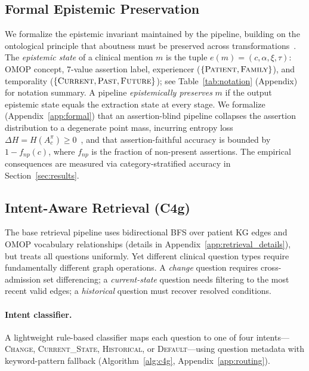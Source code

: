 \subsection{Formal Epistemic Preservation}
\label{sec:system:formal}

We formalize the epistemic invariant maintained by the \epikg pipeline, building on the ontological principle that aboutness must be preserved across transformations~\cite{ceusters2015ontologyepistemology}.
The \emph{epistemic state} of a clinical mention $m$ is the tuple $e(m) = (c, \alpha, \xi, \tau)$: OMOP concept, 7-value assertion label, experiencer ($\{\textsc{Patient}, \textsc{Family}\}$), and temporality ($\{\textsc{Current}, \textsc{Past}, \textsc{Future}\}$); see Table~\ref{tab:notation} (Appendix) for notation summary.
A pipeline \emph{epistemically preserves} $m$ if the output epistemic state equals the extraction state at every stage.
We formalize (Appendix~\ref{app:formal}) that an assertion-blind pipeline collapses the assertion distribution to a degenerate point mass, incurring entropy loss $\Delta H = H(A_c^\pi) \geq 0$~\cite{shannon1948}, and that assertion-faithful accuracy is bounded by $1 - f_{\textit{np}}(c)$, where $f_{\textit{np}}$ is the fraction of non-present assertions.
The empirical consequences are measured via category-stratified accuracy in Section~\ref{sec:results}.


\subsection{Intent-Aware Retrieval (C4g)}
\label{sec:system:intentaware}

The base retrieval pipeline uses bidirectional BFS over patient KG edges and OMOP vocabulary relationships (details in Appendix~\ref{app:retrieval_details}), but treats all questions uniformly.
Yet different clinical question types require fundamentally different graph operations.
A \emph{change} question requires cross-admission set differencing; a \emph{current-state} question needs filtering to the most recent valid edges; a \emph{historical} question must recover resolved conditions.

\paragraph{Intent classifier.}
A lightweight rule-based classifier maps each question to one of four intents---\textsc{Change}, \textsc{Current\_State}, \textsc{Historical}, or \textsc{Default}---using question metadata with keyword-pattern fallback (Algorithm~\ref{alg:c4g}, Appendix~\ref{app:routing}).

